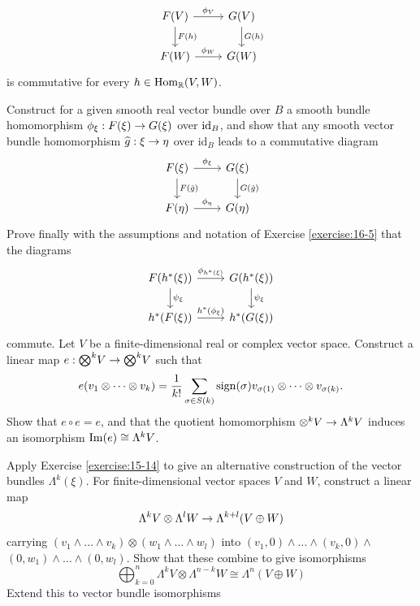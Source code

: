 \begin{enumerate}[label=\theexercise.\arabic*.,ref=\theexercise.\arabic*,leftmargin=2.7em]
\[\begin{tikzcd}
      F(V)\dar{F(h)}\rar{\phi_V} & G(V)\dar{G(h)} \\
      F(W) \rar{\phi_W} & G(W)
    \end{tikzcd}\]
    is commutative for every $h \in  {\ensuremath{\mathrm{Hom}}}_{{\mathbb{R}}}( {V,W})$.\par
    Construct for a given smooth real vector bundle over $B$ a smooth bundle homomorphism ${\phi }_{\xi } : F( \xi )  \rightarrow  G( \xi )$ over ${\mathrm{id}}_{B}$, and show that any smooth vector bundle homomorphism $\widehat{g} : \xi  \rightarrow  \eta$ over ${\mathrm{{id}}}_{B}$ leads to a commutative diagram
    \[\begin{tikzcd}
      F(\xi)\dar{F(\hat g)}\rar{\phi_\xi} & G(\xi)\dar{G(\hat g)} \\
      F(\eta) \rar{\phi_\eta} & G(\eta)
    \end{tikzcd}\]
    Prove finally with the assumptions and notation of Exercise \ref{exercise:16-5} that the diagrams
    \[\begin{tikzcd}
      F( {{h}^*( \xi ) }) \dar{{\psi }_{\xi }}\rar{{\phi }_{{h}^*( \xi ) }} & G( {{h}^*( \xi ) })\dar{{\psi }_{\xi }}\\
      {h}^*( {F( \xi ) }) \rar{{h}^*( {\phi }_{\xi }) } & {h}^*( {G( \xi ) })
    \end{tikzcd}\]
    commute.
  \NewItem Let $V$ be a finite-dimensional real or complex vector space. Construct a linear map $e : {\bigotimes }^{k}V \rightarrow  {\bigotimes }^{k}V$ such that
    \[
      e( {{v}_{1} \otimes  \cdots  \otimes  {v}_{k}})  = \frac{1}{k!}\sum_{{\sigma  \in  S( k) }}\mathrm{sign}( \sigma ) {v}_{\sigma ( 1) } \otimes  \cdots  \otimes  {v}_{\sigma ( k) }.
    \]
    Show that $e \circ  e = e$, and that the quotient homomorphism ${ \otimes  }^{k}V \rightarrow  {\Lambda }^{k}V$ induces an isomorphism $\operatorname{Im}( e)  \cong  {\Lambda }^{k}V$.\par
    Apply Exercise \ref{exercise:15-14} to give an alternative construction of the vector bundles ${\Lambda }^{k}( \xi )$.
  \NewItem For finite-dimensional vector spaces $V$ and $W$, construct a linear map
    \[
      {\Lambda }^{k}V \otimes  {\Lambda }^{l}W \rightarrow  {\Lambda }^{k + l}( {V \oplus  W})
    \]
    carrying $( {{v}_{1} \land  \ldots  \land  {v}_{k}})  \otimes  ( {{w}_{1} \land  \ldots  \land  {w}_{l}})$ into $( {{v}_{1},0})  \land  \ldots  \land  ( {{v}_{k},0})  \land$  $( {0,{w}_{1}})  \land  \ldots  \land  ( {0,{w}_{l}})$. Show that these combine to give isomorphisms
    \[
      \bigoplus_{k = 0}^n{\Lambda }^{k}V \otimes  {\Lambda }^{n- k}W \cong  {\Lambda }^{n}( {V \oplus  W})
    \]
    Extend this to vector bundle isomorphisms

\end{enumerate}
